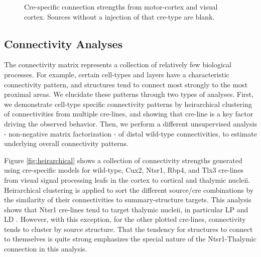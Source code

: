 \newpage

\begin{figure}[H]
    \newline
    \caption{   Cre-specific connection strengths from motor-cortex and visual cortex. Sources without a injection of that cre-type are blank. }
    \label{fig:data}
\end{figure}
\newpage


\subsection{Connectivity Analyses}


The connectivity matrix represents a collection of relatively few biological processes.
For example, certain cell-types and layers have a characteristic connectivity pattern, and structures tend to connect most strongly to the most proximal areas.
We elucidate these patterns through two types of analyses. 
First, we demonstrate cell-type specific connectivity patterns by heirarchical clustering of connectivities from multiple cre-lines, and showing that cre-line is a key factor driving the observed behavior. 
Then, we perform a different unsupervised analysis - non-negative matrix factorization - of distal wild-type connectivities, to estimate underlying overall connectivity patterns.

Figure \ref{fig:heirarchical} shows a collection of connectivity strengths generated using cre-specific models for wild-type, Cux2, Ntsr1, Rbp4, and Tlx3 cre-lines from visual signal processing leafs in the cortex to cortical and thalymic nucleii.
Heirarchical clustering is applied to sort the different source/cre combinations by the similarity of their connectivities to summary-structure targets.
This analysis shows that Ntsr1 cre-lines tend to target thalymic nucleii, in particular LP and LD \citet{Jeong2016-dc}.
However, with this exception, for the other plotted cre-lines, connectivity tends to cluster by source structure.
That the tendency for structures to connect to themselves is quite strong emphasizes the special nature of the Ntsr1-Thalymic connection in this analysis.

